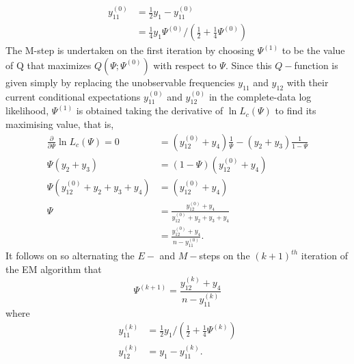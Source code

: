 \begin{exam}
\begin{align*}
        y_{11}^{(0)} & = \frac{1}{2} y_1 - y_{11}^{(0)}                                                     \\
                     & = \frac{1}{4} y_{1} \Psi^{(0)} / \left( \frac{1}{2} + \frac{1}{4} \Psi^{(0)} \right)
    \end{align*}
    The M-step is undertaken on the first iteration by choosing $\Psi^{(1)}$ to be the value of Q that maximizes $Q \left( \Psi ; \Psi^{(0)} \right)$ with respect to $\Psi$. Since this $Q-$function is given simply by replacing the unobservable frequencies $y_{11}$ and $y_{12}$ with their current conditional expectations $y_{11}^{(0)}$ and $y_{12}^{(0)}$ in the complete-data log likelihood, $\Psi^{(1)}$ is obtained taking the derivative of $\ln L_c (\Psi)$ to find its maximising value, that is,
    \begin{align*}
        \frac{\partial}{\partial \Psi} \ln L_c (\Psi) = 0  \
         & = \left( y_{12}^{(0)} + y_4 \right) \frac{1}{\Psi} - \left( y_2 + y_3 \right) \frac{1}{1-\Psi} \\
        \Psi \left( y_2 + y_3 \right)
         & = (1-\Psi) \left( y_{12}^{(0)} + y_4 \right)                                                   \\
        \Psi \left( y_{12}^{(0)} + y_2 + y_3 + y_4 \right)
         & = \left( y_{12}^{(0)} + y_4 \right)                                                            \\
        \Psi
         & = \frac{y_{12}^{(0)} + y_4}{y_{12}^{(0)} + y_2 + y_3 + y_4}                                    \\
         & = \frac{y_{12}^{(0)} + y_4}{n - y_{11}^{(0)}}.
    \end{align*}
    It follows on so alternating the $E-$ and $M-$steps on the $(k+1)^{th}$ iteration of the EM algorithm that
    \begin{equation*}
        \Psi^{(k+1)} = \frac{y_{12}^{(k)} + y_4}{n - y_{11}^{(k)}}
    \end{equation*}
    where
    \begin{align*}
        y_{11}^{(k)} & = \frac{1}{2} y_1 / \left( \frac{1}{2} + \frac{1}{4} \Psi^{(k)} \right) \\
        y_{12}^{(k)} & = y_1 - y_{11}^{(k)}.
    \end{align*}
\end{exam}

